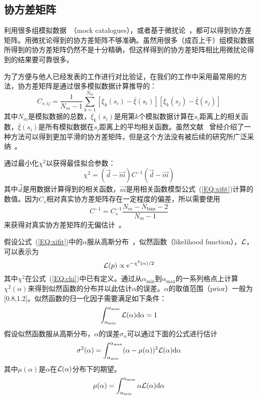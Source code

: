 \subsection{协方差矩阵}

利用很多组模拟数据~\cite{Hamilton2006,Takahashi2009,Xu2012}（mock catalogues），或者基于微扰论~\cite{Scoccimarro2002}，都可以得到协方差矩阵。用微扰论得到的协方差矩阵不够准确。虽然用很多（成百上千）组模拟数据所得到的协方差矩阵仍然不是十分精确，但这样得到的协方差矩阵相比用微扰论得到的结果要可靠很多。

为了方便与他人已经发表的工作进行对比验证，在我们的工作中采用最常用的方法，协方差矩阵是通过很多模拟数据计算推导的：
\begin{equation}
C_{s,ij} = \frac{1}{N_m - 1} \sum^{N_m}_{k = 1} [\xi_k(s_i) - \bar{\xi}(s_i)][\xi_k(s_j) - \bar{\xi}(s_j)]
\end{equation}
其中$N_m$是模拟数据的总数，$\xi_k(s_i)$是用第$k$个模拟数据计算在$s_i$距离上的相关函数，$\bar{\xi}(s_i)$是所有模拟数据在$s_i$距离上的平均相关函数。虽然文献 ~曾经介绍了一种方法可以得到更加平滑的协方差矩阵，但是这个方法没有被后续的研究所广泛采纳~\cite{Mariana2016,Ross2017}。

通过最小化$\chi^2$以获得最佳拟合参数：
\begin{equation}\label{EQ:chi}
\chi^2 = (\vec{d} - \vec{m}) C^{-1} (\vec{d} - \vec{m})
\end{equation}
其中$\vec{d}$是用数据计算得到的相关函数，$\vec{m}$是用相关函数模型公式~(\ref{EQ:xifit})计算的数值。因为$C_s$相对真实协方差矩阵存在一定程度的偏差，所以需要使用
\begin{equation}
C^{-1} = C^{-1}_s \frac{N_{m} - N_{\mathrm{bins}} - 2}{N_{m} - 1}
\end{equation}
来获得对真实协方差矩阵的无偏估计~\cite{Hartlap2007,Percival2014}。

假设公式~(\ref{EQ:xifit})中的$\alpha$服从高斯分布~\cite{Xu2012}，似然函数（likelihood function），${\cal L}$，可以表示为 
\begin{equation}
{\cal L}(p) \propto \mathrm{e}^{-\chi^2(\alpha)/2}
\end{equation}
其中$\chi^2$在公式~(\ref{EQ:chi})中已有定义。通过从$\alpha_{\mathrm{min}}$到$\alpha_{\mathrm{max}}$的一系列格点上计算$\chi^2(\alpha)$来得到似然函数的分布并以此估计$\alpha$的误差。$\alpha$的取值范围（prior）一般为[0.8,1.2]。似然函数的归一化因子需要满足如下条件：
\begin{equation}
\int^{\alpha_{\mathrm{max}}}_{\alpha_{\mathrm{min}}} {\cal L}(\alpha) {\mathrm d}\alpha = 1
\end{equation}
假设似然函数服从高斯分布，$\alpha$的误差$\sigma_{\alpha}$可以通过下面的公式进行估计
\begin{equation}
\sigma^2(\alpha) = \int^{\alpha_{\mathrm{max}}}_{\alpha_{\mathrm{min}}} (\alpha - \mu(\alpha))^2 {\cal L}(\alpha) \mathrm{d}\alpha
\end{equation}
其中$\mu(\alpha)$是$\alpha$在${\cal L}(\alpha)$分布下的期望。
\begin{equation}
\mu(\alpha) = \int^{\alpha_{\mathrm{max}}}_{\alpha_{\mathrm{min}}} \alpha {\cal L}(\alpha) {\mathrm d}\alpha
\end{equation}


